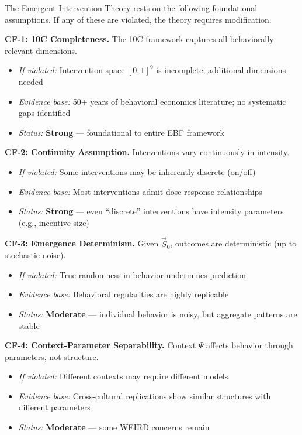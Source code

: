 \begin{tcolorbox}[colback=red!5!white, colframe=red!75!black,
    title=\textbf{Critical Foundations: What EIT Depends On}]

The Emergent Intervention Theory rests on the following foundational assumptions. If any of these are violated, the theory requires modification.

\textbf{CF-1: 10C Completeness.} The 10C framework captures all behaviorally relevant dimensions.
\begin{itemize}[nosep]
    \item \textit{If violated:} Intervention space $[0,1]^9$ is incomplete; additional dimensions needed
    \item \textit{Evidence base:} 50+ years of behavioral economics literature; no systematic gaps identified
    \item \textit{Status:} \textbf{Strong} --- foundational to entire EBF framework
\end{itemize}

\textbf{CF-2: Continuity Assumption.} Interventions vary continuously in intensity.
\begin{itemize}[nosep]
    \item \textit{If violated:} Some interventions may be inherently discrete (on/off)
    \item \textit{Evidence base:} Most interventions admit dose-response relationships
    \item \textit{Status:} \textbf{Strong} --- even ``discrete'' interventions have intensity parameters (e.g., incentive size)
\end{itemize}

\textbf{CF-3: Emergence Determinism.} Given $\vec{S}_0$, outcomes are deterministic (up to stochastic noise).
\begin{itemize}[nosep]
    \item \textit{If violated:} True randomness in behavior undermines prediction
    \item \textit{Evidence base:} Behavioral regularities are highly replicable \citep{camerer2016}
    \item \textit{Status:} \textbf{Moderate} --- individual behavior is noisy, but aggregate patterns are stable
\end{itemize}

\textbf{CF-4: Context-Parameter Separability.} Context $\Psi$ affects behavior through parameters, not structure.
\begin{itemize}[nosep]
    \item \textit{If violated:} Different contexts may require different models
    \item \textit{Evidence base:} Cross-cultural replications show similar structures with different parameters
    \item \textit{Status:} \textbf{Moderate} --- some WEIRD concerns remain \citep{henrich2010weirdest}
\end{itemize}


\end{tcolorbox}
